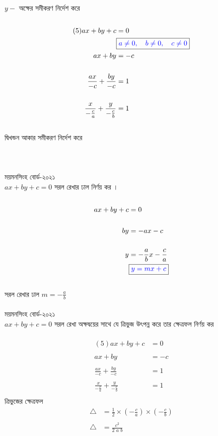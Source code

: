 \documentclass{article}
\begin{document}
\\
$y-$ অক্ষের সমীকরণ নির্দেশ করে\\ 
\\ 
\begin{align*}
(5)	ax+by+c&=0\\
&\boxed{\textcolor{blue}{a\ne 0, \quad b\ne 0, \quad c \ne 0}}\\
ax+by&=-c\\
\\
\frac{ax}{-c}+\frac{by}{-c}&=1\\
\\
\frac{x}{-\frac{c}{a}}+\frac{y}{-\frac{c}{b}}&=1
\end{align*}
\\
দ্বিখন্ডন আকার সমীকরণ নির্দেশ করে\\
\\ 
\\
\\ 
	ময়মনসিংহ বোর্ড-২০২১\\ 
$ax+by+c=0$ সরল রেখার ঢাল নির্ণয় কর । \\
\\
\begin{align*}
ax+by+c&=0\\
\\
by&=-ax-c\\
\\
y&=-\frac{a}{b}x-\frac{c}{a}\\
&\boxed{\textcolor{blue}{y=mx+c}}
\end{align*}
\\
সরল রেখার ঢাল	$m=-\frac{a}{b}$\\
\\
ময়মনসিংহ বোর্ড-২০২১\\ 
$ax+by+c=0$ সরল রেখা অক্ষদ্বয়ের সাথে যে ত্রিভুজ উৎপন্ন করে তার ক্ষেত্রফল নির্ণয় কর\\
\\ 
\begin{align*}
	(5)	ax+by+c&=0\\
\\
	ax+by&=-c\\
	\\
	\frac{ax}{-c}+\frac{by}{-c}&=1\\
	\\
	\frac{x}{-\frac{c}{a}}+\frac{y}{-\frac{c}{b}}&=1\\
\end{align*}
ত্রিভুজের ক্ষেত্রফল \\ 
\begin{align*}
	\triangle &=\frac{1}{2}\times \left(-\frac{c}{a}\right)\times \left(-\frac{c}{b}\right)\\
	\\
	\triangle &=\frac{c^2}{2\,\,a\,\,b}
\end{align*}
\end{document}
